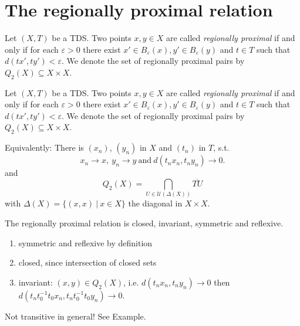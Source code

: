 \section{The regionally proximal relation}

\begin{frame}
  \begin{definition}
    \label{def:rpr}
    Let $(X, T)$ be a TDS.
    Two points $x,y \in X$ are called \emph{regionally proximal}
    if and only if for each $\varepsilon > 0$ there exist $x' \in B_\varepsilon(x), y' \in B_\varepsilon(y)$
    and $t \in T$ such that $d(tx', ty') < \varepsilon$.
    We denote the set of regionally proximal pairs by $Q_2(X) \subseteq X \times X$.
  \end{definition}

  \begin{center}
    
  \end{center}
    
\end{frame}

\begin{frame}

  \begin{definition}
    \label{def:rpr}
    Let $(X, T)$ be a TDS.
    Two points $x,y \in X$ are called \emph{regionally proximal}
    if and only if for each $\varepsilon > 0$ there exist $x' \in B_\varepsilon(x), y' \in B_\varepsilon(y)$
    and $t \in T$ such that $d(tx', ty') < \varepsilon$.
    We denote the set of regionally proximal pairs by $Q_2(X) \subseteq X \times X$.
  \end{definition}
  Equivalently: There is $(x_n)$, $(y_n)$ in $X$ and $(t_n)$ in $T$, s.t.
  \begin{equation}
      \label{eq:rprchar}
      x_n \to x, \ y_n \to y \ \text{and} \ d(t_n x_n, t_n y_n) \to 0.
  \end{equation} 
  and
  \begin{equation*}
    Q_2(X) = \bigcap_{U \in \mathcal{U}(\Delta(X))} \overline{TU} 
  \end{equation*}
  with $\Delta(X) = \{(x, x) \ | \ x \in X\}$ the diagonal in $X \times X$.
\end{frame}

\begin{frame}
\begin{theorem}
  The regionally proximal relation is closed, invariant, symmetric and reflexive.
\end{theorem}

\begin{enumerate}
  \item symmetric and reflexive by definition
  \item closed, since intersection of closed sets
  \item invariant: $(x, y) \in Q_2(X)$, i.e. $d(t_n x_n, t_n y_n) \to 0$ then $d(t_n t_0^{-1} t_0 x_n, t_n t_0^{-1} t_0 y_n) \to 0$.
\end{enumerate}

Not transitive in general! See Example.
\end{frame}


